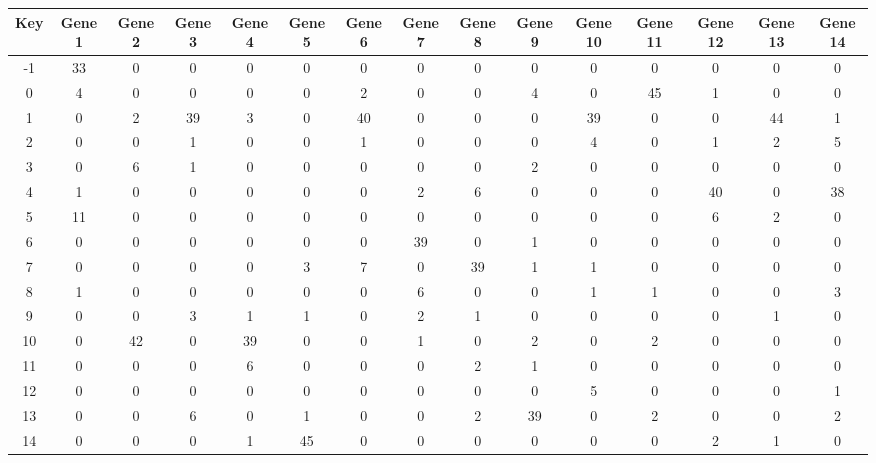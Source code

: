 \begin{tabular}{|c|c|c|c|c|c|c|c|c|c|c|c|c|c|c|}
\hline
Key & Gene 1 & Gene 2 & Gene 3 & Gene 4 & Gene 5 & Gene 6 & Gene 7 & Gene 8 & Gene 9 & Gene 10 & Gene 11 & Gene 12 & Gene 13 & Gene 14 \\
\hline
-1 & 33 & 0 & 0 & 0 & 0 & 0 & 0 & 0 & 0 & 0 & 0 & 0 & 0 & 0 \\
0 & 4 & 0 & 0 & 0 & 0 & 2 & 0 & 0 & 4 & 0 & 45 & 1 & 0 & 0 \\
1 & 0 & 2 & 39 & 3 & 0 & 40 & 0 & 0 & 0 & 39 & 0 & 0 & 44 & 1 \\
2 & 0 & 0 & 1 & 0 & 0 & 1 & 0 & 0 & 0 & 4 & 0 & 1 & 2 & 5 \\
3 & 0 & 6 & 1 & 0 & 0 & 0 & 0 & 0 & 2 & 0 & 0 & 0 & 0 & 0 \\
4 & 1 & 0 & 0 & 0 & 0 & 0 & 2 & 6 & 0 & 0 & 0 & 40 & 0 & 38 \\
5 & 11 & 0 & 0 & 0 & 0 & 0 & 0 & 0 & 0 & 0 & 0 & 6 & 2 & 0 \\
6 & 0 & 0 & 0 & 0 & 0 & 0 & 39 & 0 & 1 & 0 & 0 & 0 & 0 & 0 \\
7 & 0 & 0 & 0 & 0 & 3 & 7 & 0 & 39 & 1 & 1 & 0 & 0 & 0 & 0 \\
8 & 1 & 0 & 0 & 0 & 0 & 0 & 6 & 0 & 0 & 1 & 1 & 0 & 0 & 3 \\
9 & 0 & 0 & 3 & 1 & 1 & 0 & 2 & 1 & 0 & 0 & 0 & 0 & 1 & 0 \\
10 & 0 & 42 & 0 & 39 & 0 & 0 & 1 & 0 & 2 & 0 & 2 & 0 & 0 & 0 \\
11 & 0 & 0 & 0 & 6 & 0 & 0 & 0 & 2 & 1 & 0 & 0 & 0 & 0 & 0 \\
12 & 0 & 0 & 0 & 0 & 0 & 0 & 0 & 0 & 0 & 5 & 0 & 0 & 0 & 1 \\
13 & 0 & 0 & 6 & 0 & 1 & 0 & 0 & 2 & 39 & 0 & 2 & 0 & 0 & 2 \\
14 & 0 & 0 & 0 & 1 & 45 & 0 & 0 & 0 & 0 & 0 & 0 & 2 & 1 & 0 \\
\hline
\end{tabular}